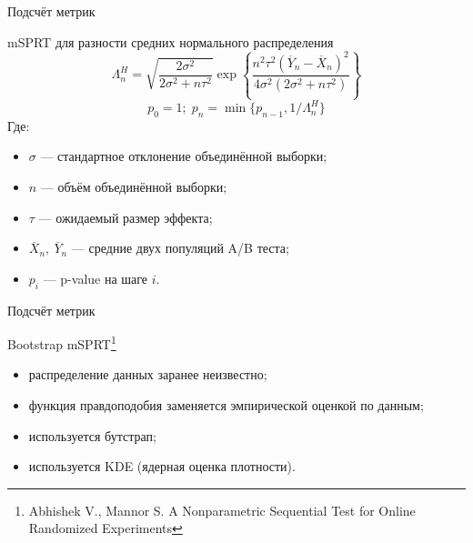 \documentclass[12pt, unicode]{beamer}
\newif\ifmetropolis
\begin{document}
	
	\begin{frame}[fragile]{Подсчёт метрик}
		\begin{block}{mSPRT для разности средних нормального распределения}
			\begin{equation}
				\label{eqn:mSPRT}
				\Lambda_{n}^{H} = \sqrt{\frac{2\sigma^2}{2\sigma^2 +n\tau^2}} \exp\left\{\frac{n^2\tau^2 (\overline{Y}_n-\overline{X}_n)^2}{4\sigma^2(2\sigma^2+n\tau^2)}\right\}
			\end{equation}
			\begin{equation}
				p_0=1;\;p_n=\min\{p_{n-1},1/\Lambda_{n}^{H}\}
			\end{equation}
			Где:
			\vspace*{-0.5cm}
			\begin{itemize}
				\item $\sigma$ --- стандартное отклонение объединённой выборки;
				\item $n$ --- объём объединённой выборки;
				\item $\tau$ --- ожидаемый размер эффекта;
				\item $\overline{X}_n,\ \overline{Y}_n$ --- средние двух популяций A/B теста;
				\item $p_i$ --- p-value на шаге $i$.
			\end{itemize}
			\vspace*{-0.5cm}
		\end{block}
		\vfill\null
	\end{frame}
	

	\begin{frame}[fragile]{Подсчёт метрик}
		\begin{block}{Bootstrap mSPRT\footnote[2]{
					Abhishek V., Mannor S. A Nonparametric Sequential Test for Online Randomized
Experiments
			}}
			\ifmetropolis
				\smallskip
			\fi
			\begin{itemize}
				\item распределение данных заранее неизвестно;
				\item функция правдоподобия заменяется эмпирической оценкой по данным;
				\item используется бутстрап;
				\item используется KDE (ядерная оценка плотности).
			\end{itemize}
		\end{block}
		\vfill\null
	\end{frame}
\end{document}
